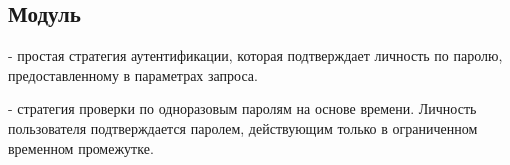 \subsection{Модуль }\label{page-FPauth-strategies-module-FPauth+u+strategies}%
\label{page-FPauth-strategies-module-FPauth+u+strategies-module-Password}\begin{ocamlindent} - простая стратегия аутентификации, которая подтверждает личность по паролю, предоставленному в параметрах запроса.\end{ocamlindent}%
\medbreak
\label{page-FPauth-strategies-module-FPauth+u+strategies-module-TOTP}\begin{ocamlindent} - стратегия проверки по одноразовым паролям на основе времени. Личность пользователя подтверждается паролем, действующим только в ограниченном временном промежутке.\end{ocamlindent}%
\medbreak



